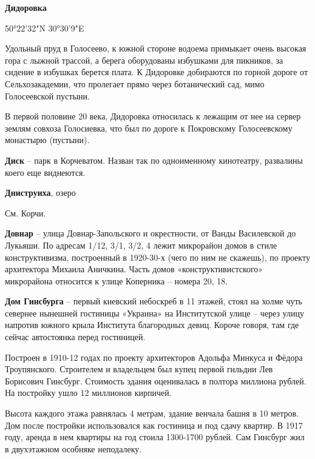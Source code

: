 \newpage

\textbf{Дидоровка}
 
50°22'32"N 30°30'9"E

Удольный пруд в Голосеево, к южной стороне водоема примыкает очень высокая гора с лыжной трассой, а берега оборудованы избушками для пикников, за сидение в избушках берется плата. К Дидоровке добираются по горной дороге от Сельхозакадемии, что пролегает прямо через ботанический сад, мимо Голосеевской пустыни.

В первой половине 20 века, Дидоровка относилась к лежащим от нее на сервер землям совхоза Голосиевка, что был по дороге к Покровскому Голосеевскому монастырю (пустыни).\\

\medskip

\textbf{Диск} – парк в Корчеватом. Назван так по одноименному кинотеатру, развалины коего еще виднеются.\\

\medskip

\textbf{Дниструиха}, озеро

См. Корчи.\\

\medskip

\textbf{Довнар} – улица Довнар-Запольского и окре\-стности, от Ванды Василевской до Лукьяши. По адресам 1/12, 3/1, 3/2, 4 лежит микрорайон домов в стиле конструктивизма, построенный в 1920-30-х (чего по ним не скажешь), по проекту архитектора Михаила Аничкина. Часть домов «конструктивистского» микрорайона относится к улице Коперника – номера 20, 18.\\

\medskip

\textbf{Дом Гинсбурга} – первый киевский небоскреб в 11 этажей, стоял на холме чуть севернее нынешней гостиницы «Украина» на Институтской улице – через улицу напротив южного крыла Института благородных девиц. Короче говоря, там где сейчас автостоянка перед гостиницей. 

Построен в 1910-12 годах по проекту архитекторов Адольфа Минкуса и Фёдора Троупянского. Строителем и владельцем был купец первой гильдии Лев Борисович Гинсбург. Стоимость здания оценивалась в полтора миллиона рублей. На постройку ушло 12 миллионов кирпичей. 

Высота каждого этажа равнялась 4 метрам, здание венчала башня в 10 метров. Дом после постройки использовался как гостиница и под сдачу квартир. В 1917 году, аренда в нем квартиры на год стоила 1300-1700 рублей. Сам Гинсбург жил в двухэтажном особняке неподалеку.

